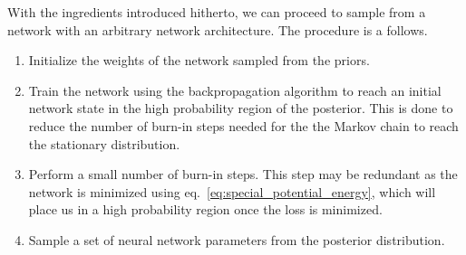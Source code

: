 With the ingredients introduced hitherto, we can proceed to sample from a network with an arbitrary network architecture.
The procedure is a follows. 

\begin{enumerate}
  \item Initialize the weights of the network sampled from the priors.
  \item Train the network using the backpropagation algorithm to reach an initial network state in the high probability region of the posterior.
  This is done to reduce the number of burn-in steps needed for the the Markov chain to reach the stationary distribution.
  \item Perform a small number of burn-in steps. This step may be redundant as the network is minimized using eq.~\eqref{eq:special_potential_energy},
  which will place us in a high probability region once the loss is minimized. 
  \item Sample a set of neural network parameters from the posterior distribution.
\end{enumerate}
